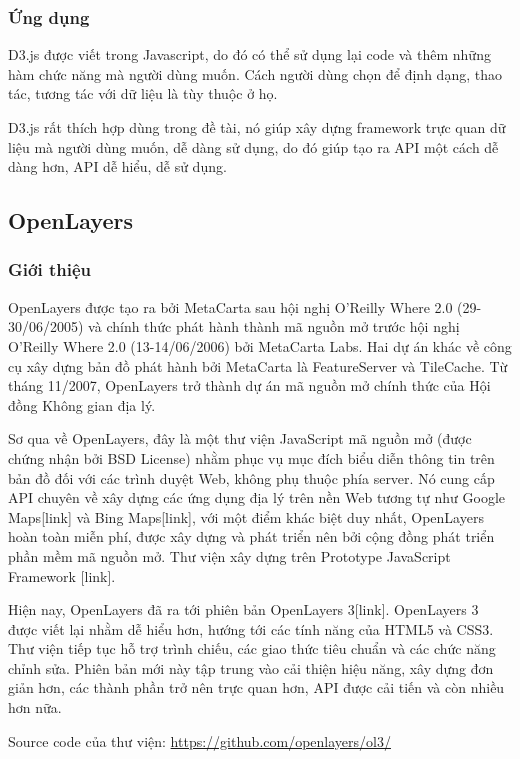 \documentclass[12pt,a4paper,oneside]{article}
\begin{document}
\subsubsection{Ứng dụng}
D3.js được viết trong Javascript, do đó có thể sử dụng lại code và thêm những hàm chức năng mà người dùng muốn. Cách người dùng chọn để định dạng, thao tác, tương tác với dữ liệu là tùy thuộc ở họ.

D3.js rất thích hợp dùng trong đề tài, nó giúp xây dựng framework trực quan dữ liệu mà người dùng muốn, dễ dàng sử dụng, do đó giúp tạo ra API một cách dễ dàng hơn, API dễ hiểu, dễ sử dụng.

\subsection{OpenLayers}
\subsubsection{Giới thiệu}
OpenLayers được tạo ra bởi MetaCarta sau hội nghị O'Reilly Where 2.0 (29-30/06/2005) và chính thức phát hành thành mã nguồn mở trước hội nghị  O'Reilly Where 2.0 (13-14/06/2006) bởi MetaCarta Labs. Hai dự án khác về công cụ xây dựng bản đồ phát hành bởi MetaCarta là FeatureServer và TileCache. Từ tháng 11/2007, OpenLayers trở thành dự án mã nguồn mở chính thức của Hội đồng Không gian địa lý.

Sơ qua về OpenLayers, đây là một thư viện JavaScript mã nguồn mở (được chứng nhận bởi BSD License) nhằm phục vụ mục đích biểu diễn thông tin trên bản đồ  đối với các trình duyệt Web, không phụ thuộc phía server. Nó cung cấp API chuyên về xây dựng các ứng dụng địa lý trên nền Web tương tự như Google Maps[link] và Bing Maps[link], với một điểm khác biệt duy nhất, OpenLayers hoàn toàn miễn phí, được xây dựng và phát triển nên bởi cộng đồng phát triển phần mềm mã nguồn mở. Thư viện xây dựng trên Prototype JavaScript Framework [link].

Hiện nay, OpenLayers đã ra tới phiên bản OpenLayers 3[link]. OpenLayers 3 được viết lại nhằm dễ hiểu hơn, hướng tới các tính năng của HTML5 và CSS3. Thư viện tiếp tục hỗ trợ trình chiếu, các giao thức tiêu chuẩn và các chức năng chỉnh sửa. Phiên bản mới này tập trung vào cải thiện hiệu năng, xây dựng đơn giản hơn, các thành phần trở nên trực quan hơn, API được cải tiến và còn nhiều hơn nữa.

Source code của thư viện: \href{https://github.com/openlayers/ol3/}{https://github.com/openlayers/ol3/}
\end{document}
